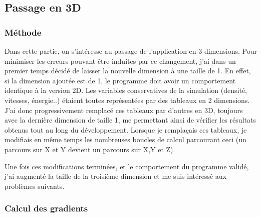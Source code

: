 \subsection{Passage en 3D}

\subsubsection{Méthode}\label{sec:3dmeth}
Dans cette partie, on s'intéresse au passage de l'application en 3 dimensions. Pour minimiser les erreurs pouvant être induites par ce changement, j'ai dans un premier temps décidé de laisser la nouvelle dimension à une taille de 1. En effet, si la dimension ajoutée est de 1, le programme doit avoir un comportement identique à la version 2D. Les variables conservatives de la simulation (densité, vitesses, énergie..) étaient toutes représentées par des tableaux en 2 dimensions. J'ai donc progressivement remplacé ces tableaux par d'autres en 3D, toujours avec la dernière dimension de taille 1,  me permettant ainsi de vérifier les résultats obtenus tout au long du développement. Lorsque je remplaçais ces tableaux, je modifiais en même temps les nombreuses boucles de calcul parcourant ceci (un parcours sur X et Y devient un parcours sur X,Y et Z). 

Une fois ces modifications terminées, et le comportement du programme validé, j'ai augmenté la taille de la troisième dimension et me suis intéressé aux problèmes suivants.




\subsubsection{Calcul des gradients}%

